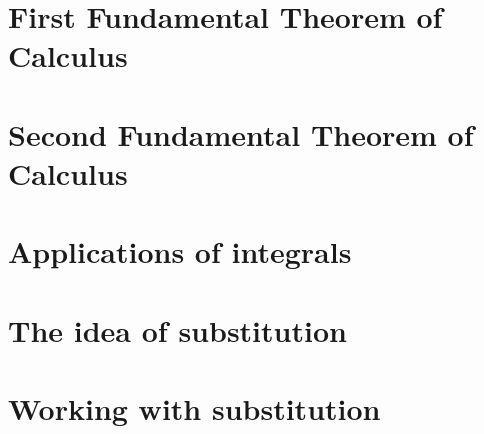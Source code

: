 \documentclass[newpage]{xourse}
\begin{document}
\part{First Fundamental Theorem of Calculus}

\part{Second Fundamental Theorem of Calculus}

\part{Applications of integrals}

\part{The idea of substitution}

\part{Working with substitution}
\end{document}
